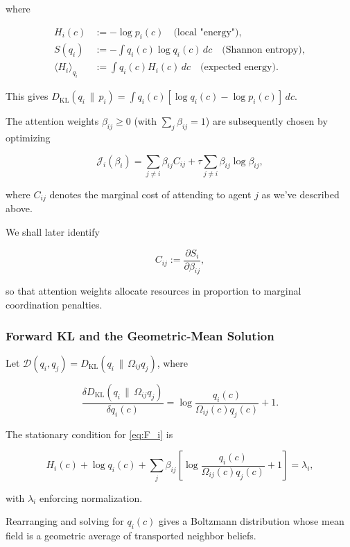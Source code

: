 \documentclass[11pt]{article}
\begin{document}
where

\begin{align}
H_i(c) &:= -\log p_i(c) \quad \text{(local "energy")}, \\
S(q_i) &:= -\int q_i(c) \log q_i(c)\,dc \quad \text{(Shannon entropy)}, \\
\langle H_i \rangle_{q_i} &:= \int q_i(c) H_i(c)\,dc \quad \text{(expected energy)}.
\end{align}

This gives $D_{\mathrm{KL}}(q_i \,\|\, p_i) = \int q_i(c)[\log q_i(c) - \log p_i(c)]\,dc$.

The attention weights $\beta_{ij}\ge 0$ (with $\sum_j \beta_{ij}=1$) are subsequently chosen by optimizing

\begin{equation}
\mathcal{J}_i(\beta_i)
=\sum_{j\neq i}\beta_{ij} C_{ij}
+ \tau \sum_{j\neq i}\beta_{ij}\log\beta_{ij},
\label{eq:J_i}
\end{equation}

where $C_{ij}$ denotes the marginal cost of attending to agent $j$ as we've described above.

We shall later identify

\begin{equation}
C_{ij} := \frac{\partial S_i}{\partial \beta_{ij}},
\end{equation}

so that attention weights allocate resources in proportion to marginal coordination penalties.

\subsubsection{Forward KL and the Geometric-Mean Solution}
Let $\mathcal{D}(q_i,q_j) = D_{\mathrm{KL}}(q_i \,\|\, \Omega_{ij} q_j)$, where

\[
\frac{\delta D_{\mathrm{KL}}(q_i \,\|\, \Omega_{ij} q_j)}{\delta q_i(c)} 
= \log\frac{q_i(c)}{\Omega_{ij}(c) q_j(c)} + 1.
\]

The stationary condition for \eqref{eq:F_i} is

\begin{equation}
H_i(c)
+ \log q_i(c)
+ \sum_j \beta_{ij}
\!\left[
\log\frac{q_i(c)}{\Omega_{ij}(c)q_j(c)}+1
\right]
= \lambda_i,
\end{equation}

with $\lambda_i$ enforcing normalization.

Rearranging and solving for $q_i(c)$ gives a Boltzmann distribution whose mean field is a geometric average of transported neighbor beliefs.
\end{document}
